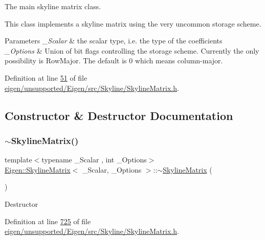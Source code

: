 The main skyline matrix class. 

This class implements a skyline matrix using the very uncommon storage scheme.


\begin{DoxyParams}{Parameters}
{\em \+\_\+\+Scalar} & the scalar type, i.\+e. the type of the coefficients \\
\hline
{\em \+\_\+\+Options} & Union of bit flags controlling the storage scheme. Currently the only possibility is Row\+Major. The default is 0 which means column-\/major. \\
\hline
\end{DoxyParams}


Definition at line \hyperlink{eigen_2unsupported_2_eigen_2src_2_skyline_2_skyline_matrix_8h_source_l00051}{51} of file \hyperlink{eigen_2unsupported_2_eigen_2src_2_skyline_2_skyline_matrix_8h_source}{eigen/unsupported/\+Eigen/src/\+Skyline/\+Skyline\+Matrix.\+h}.



\subsection{Constructor \& Destructor Documentation}
\mbox{\label{class_eigen_1_1_skyline_matrix_a456b254a757d26580b2c05fe270eaae7}} 
\subsubsection{\texorpdfstring{$\sim$\+Skyline\+Matrix()}{~SkylineMatrix()}\hspace{0.1cm}{\footnotesize\ttfamily [1/2]}}
{\footnotesize\ttfamily template$<$typename \+\_\+\+Scalar , int \+\_\+\+Options$>$ \\
\hyperlink{class_eigen_1_1_skyline_matrix}{Eigen\+::\+Skyline\+Matrix}$<$ \+\_\+\+Scalar, \+\_\+\+Options $>$\+::$\sim$\hyperlink{class_eigen_1_1_skyline_matrix}{Skyline\+Matrix} (\begin{DoxyParamCaption}{ }\end{DoxyParamCaption})\hspace{0.3cm}{\ttfamily [inline]}}

Destructor 

Definition at line \hyperlink{eigen_2unsupported_2_eigen_2src_2_skyline_2_skyline_matrix_8h_source_l00725}{725} of file \hyperlink{eigen_2unsupported_2_eigen_2src_2_skyline_2_skyline_matrix_8h_source}{eigen/unsupported/\+Eigen/src/\+Skyline/\+Skyline\+Matrix.\+h}.

